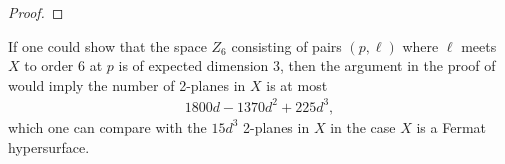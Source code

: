 \documentclass[12pt,reqno]{amsart}
\theoremstyle{plain}
\theoremstyle{remark}
\numberwithin{equation}{section}
\numberwithin{equation}{section}
\begin{document}
\begin{proof}

\end{proof}

\begin{remark}
If one could show that the space $Z_6$ consisting of pairs $(p,\ell)$ where $\ell$ meets $X$ to order 6 at $p$ is of expected dimension 3, then the argument in the proof of  would imply the number of 2-planes in $X$ is at most
\begin{align*}
    1800 d - 1370 d^2 + 225 d^3,
\end{align*}
which one can compare with the $15d^3$ 2-planes in $X$ in the case $X$ is a Fermat hypersurface. 

\end{remark}











\end{document}
